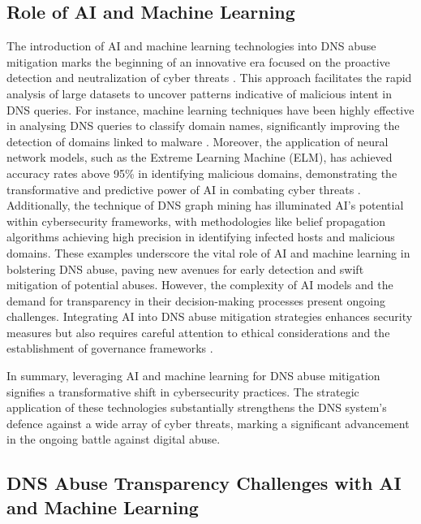 \subsection{Role of AI and Machine Learning}

The introduction of AI and machine learning technologies into DNS abuse mitigation marks the beginning of an innovative era focused on the proactive detection and neutralization of cyber threats \cite{tariq2023critical}.  This approach facilitates the rapid analysis of large datasets to uncover patterns indicative of malicious intent in DNS queries. For instance, machine learning techniques have been highly effective in analysing DNS queries to classify domain names, significantly improving the detection of domains linked to malware \cite{LiMaliciousDomainDetection2020} . Moreover, the application of neural network models, such as the Extreme Learning Machine (ELM), has achieved accuracy rates above 95\% in identifying malicious domains, demonstrating the transformative and predictive power of AI in combating cyber threats \cite{ZouDNSGraphMining2015}. Additionally, the technique of DNS graph mining has illuminated AI's potential within cybersecurity frameworks, with methodologies like belief propagation algorithms achieving high precision in identifying infected hosts and malicious domains. These examples underscore the vital role of AI and machine learning in bolstering DNS abuse, paving new avenues for early detection and swift mitigation of potential abuses. However, the complexity of AI models and the demand for transparency in their decision-making processes present ongoing challenges. Integrating AI into DNS abuse mitigation strategies enhances security measures but also requires careful attention to ethical considerations and the establishment of governance frameworks \cite{AntonakakisMalwareDomainsUpperDNS2011}.

In summary, leveraging AI and machine learning for DNS abuse mitigation signifies a transformative shift in cybersecurity practices. The strategic application of these technologies substantially strengthens the DNS system's defence against a wide array of cyber threats, marking a significant advancement in the ongoing battle against digital abuse.

\subsection{DNS Abuse Transparency Challenges with AI and Machine Learning}

